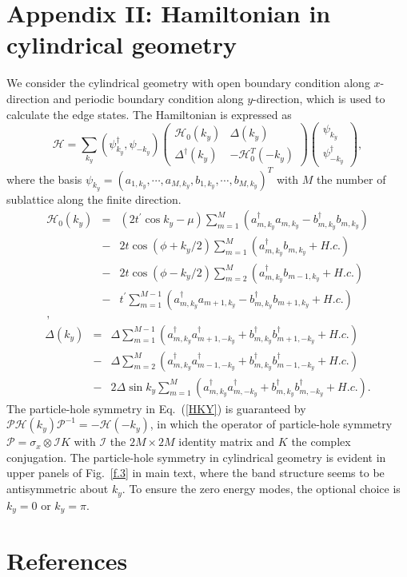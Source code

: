 \documentclass[12pt]{iopart}
\begin{document}
\section*{Appendix II: Hamiltonian in cylindrical geometry}
\label{Adix2}
We consider the cylindrical geometry with open boundary condition along $x$-direction and periodic boundary condition along $y$-direction, which is used to calculate the edge states. The Hamiltonian is expressed as
\begin{equation}
\mathcal{H}=\sum_{k_{y}}\left( \psi _{k_{y}}^{\dag },\psi _{-k_{y}}\right) \left(
\begin{array}{cc}
\mathcal{H}_{0}\left( k_{y}\right)  & \Delta \left( k_{y}\right)  \\
\Delta ^{\dag }\left( k_{y}\right)  & -\mathcal{H}_{0}^{T}\left( -k_{y}\right)
\end{array}%
\right) \left(
\begin{array}{c}
\psi _{k_{y}} \\
\psi _{-k_{y}}^{\dag }%
\end{array}%
\right),\label{HKY}
\end{equation}%
where the basis $\psi _{k_{y}}=\left( a_{1,k_{y}},\cdots
,a_{M,k_{y}},b_{1,k_{y}},\cdots ,b_{M,k_{y}}\right) ^{T}$ with $M$ the number of sublattice along the finite direction.
\begin{eqnarray*}
\mathcal{H}_{0}\left( k_{y}\right)&=&(2t^{\prime}\cos k_{y}-\mu)\sum_{m=1}^{M}\left(
a_{m,k_{y}}^{\dag }a_{m,k_{y}}-b_{m,k_{y}}^{\dag }b_{m,k_{y}}\right)  \\
&-&2t\cos\left(\phi+k_{y}/2\right)\sum_{m=1}^{M}\left( a_{m,k_{y}}^{\dag }b_{m,k_{y}}+H.c.\right)\\
&-&2t\cos\left(\phi-k_{y}/2\right)\sum_{m=2}^{M}\left(a_{m,k_{y}}^{\dag }b_{m-1,k_{y}}+H.c.\right)\\
&-&t^{\prime }\sum_{m=1}^{M-1}\left( a_{m,k_{y}}^{\dag }a_{m+1,k_{y}}-b_{m,k_{y}}^{\dag }b_{m+1,k_{y}}+H.c.\right)  \\,
\end{eqnarray*}%
\begin{eqnarray*}
\Delta \left( k_{y}\right)&=&\Delta \sum_{m=1}^{M-1}\left( a_{m,k_{y}}^{\dag
}a_{m+1,-k_{y}}^{\dag }+b_{m,k_{y}}^{\dag }b_{m+1,-k_{y}}^{\dag
}+H.c.\right)  \\
&-&\Delta\sum_{m=2}^{M}\left(a_{m,k_{y}}^{\dag }a_{m-1,-k_{y}}^{\dag }+b_{m,k_{y}}^{\dag }b_{m-1,-k_{y}}^{\dag }+H.c.\right)\\
&-&2\Delta\sin k_{y} \sum_{m=1}^{M}\left(a_{m,k_{y}}^{\dag }a_{m,-k_{y}}^{\dag }+b_{m,k_{y}}^{\dag
}b_{m,-k_{y}}^{\dag }+H.c.\right) .
\end{eqnarray*}
The particle-hole symmetry in Eq.~(\ref{HKY}) is guaranteed by $\mathcal{P}\mathcal{H}(k_{y})\mathcal{P}^{-1}=-\mathcal{H}(-k_{y})$, in which the operator of particle-hole symmetry $\mathcal{P}=\sigma_{x}\otimes \mathcal{I} K$ with $\mathcal{I}$ the $2M\times 2M$ identity matrix and $K$ the complex conjugation. The particle-hole symmetry in cylindrical geometry is evident in upper panels of Fig.~\ref{f.3} in main text, where the band structure seems to be antisymmetric about $k_{y}$. To ensure the zero energy modes, the optional choice is $k_{y}=0$ or $k_{y}=\pi$.

\section*{References}

\end{document}
